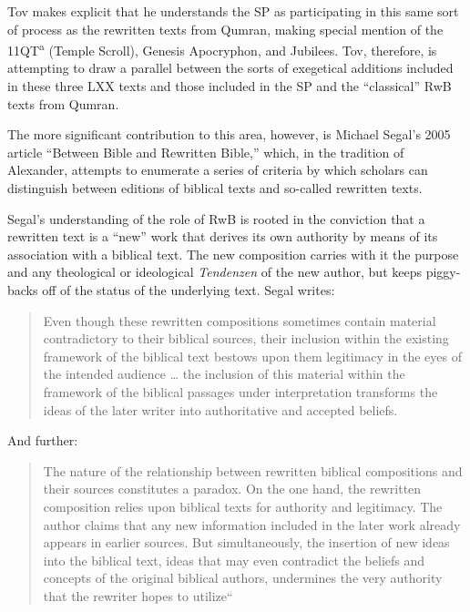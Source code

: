 Tov makes explicit that he understands the SP as participating in this
same sort of process as the rewritten texts from Qumran, making special
mention of the 11QT\textsuperscript{a} (Temple Scroll),
Genesis Apocryphon, and Jubilees. Tov, therefore, is attempting to draw
a parallel between the sorts of exegetical additions included in these
three LXX texts and those included in the SP and the ``classical'' RwB
texts from Qumran.

The more significant contribution to this area, however, is Michael
Segal's 2005 article ``Between Bible and Rewritten Bible,'' which, in
the tradition of Alexander, attempts to enumerate a series of criteria
by which scholars can distinguish between editions of biblical texts and
so-called rewritten texts.

Segal's understanding of the role of RwB is rooted in the conviction
that a rewritten text is a ``new'' work that derives its own authority
by means of its association with a biblical text. The new composition
carries with it the purpose and any theological or ideological
\emph{Tendenzen} of the new author, but keeps piggy-backs off of the
status of the underlying text.\autocite[11]{segal_henze2005} Segal
writes:

\begin{quote}
Even though these rewritten compositions sometimes contain material
contradictory to their biblical sources, their inclusion within the
existing framework of the biblical text bestows upon them legitimacy in
the eyes of the intended audience \ldots{} the inclusion of this
material within the framework of the biblical passages under
interpretation transforms the ideas of the later writer into
authoritative and accepted beliefs.\autocite[11]{segal_henze2005}
\end{quote}

And further:

\begin{quote}
The nature of the relationship between rewritten biblical compositions
and their sources constitutes a paradox. On the one hand, the rewritten
composition relies upon biblical texts for authority and legitimacy. The
author claims that any new information included in the later work
already appears in earlier sources. But simultaneously, the insertion of
new ideas into the biblical text, ideas that may even contradict the
beliefs and concepts of the original biblical authors, undermines the
very authority that the rewriter hopes to
utilize``\autocite[11-12]{segal_henze2005}
\end{quote}

